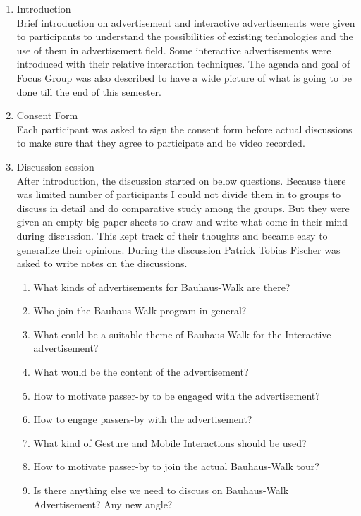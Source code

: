 \begin{enumerate}
\item Introduction \\
Brief introduction on advertisement and interactive advertisements were given to participants to understand the possibilities of existing technologies and the use of them in advertisement field. Some interactive advertisements were introduced with their relative interaction techniques. The agenda and goal of Focus Group was also described to have a wide picture of what is going to be done till the end of this semester.

\item Consent Form \\
Each participant was asked to sign the consent form before actual discussions to make sure that they agree to participate and be video recorded.

\item Discussion session \\
After introduction, the discussion started on below questions. Because there was limited number of participants I could not divide them in to groups to discuss in detail and do comparative study among the groups. But they were given an empty big paper sheets to draw and write what come in their mind during discussion. This kept track of their thoughts and became easy to generalize their opinions. During the discussion Patrick Tobias Fischer was asked to write notes on the discussions.

\begin{enumerate}
\item   What kinds of advertisements for Bauhaus-Walk are there?
\item   Who join the Bauhaus-Walk program in general?
\item   What could be a suitable theme of Bauhaus-Walk for the Interactive advertisement?
\item   What would be the content of the advertisement?
\item   How to motivate passer-by to be engaged with the advertisement?
\item   How to engage passers-by with the advertisement?
\item   What kind of Gesture and Mobile Interactions should be used?
\item   How to motivate passer-by to join the actual Bauhaus-Walk tour?
\item   Is there anything else we need to discuss on Bauhaus-Walk Advertisement? Any new angle?

\end{enumerate}


\end{enumerate}



